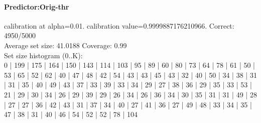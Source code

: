\documentclass[parskip=half]{scrartcl}
\begin{document}
\paragraph{Predictor:Orig-thr} calibration at alpha=0.01. calibration value=0.9999887176210966. Correct: 4950/5000\\
Average set size: 41.0188   Coverage: 0.99\\
Set size histogram (0..K):\\
0 | 199 | 175 | 164 | 150 | 143 | 114 | 103 | 95 | 89 | 60 | 80 | 73 | 64 | 78 | 61 | 50 | 53 | 65 | 52 | 62 | 40 | 47 | 48 | 42 | 54 | 43 | 43 | 45 | 43 | 32 | 40 | 50 | 34 | 38 | 31 | 31 | 35 | 40 | 49 | 43 | 37 | 33 | 39 | 33 | 34 | 29 | 27 | 38 | 36 | 29 | 35 | 33 | 53 | 21 | 29 | 30 | 34 | 26 | 29 | 39 | 29 | 26 | 34 | 26 | 36 | 34 | 30 | 35 | 31 | 31 | 49 | 28 | 27 | 27 | 36 | 42 | 43 | 31 | 37 | 34 | 40 | 27 | 41 | 36 | 27 | 49 | 48 | 33 | 34 | 35 | 47 | 38 | 31 | 40 | 46 | 54 | 52 | 52 | 78 | 104\\
\end{document}
